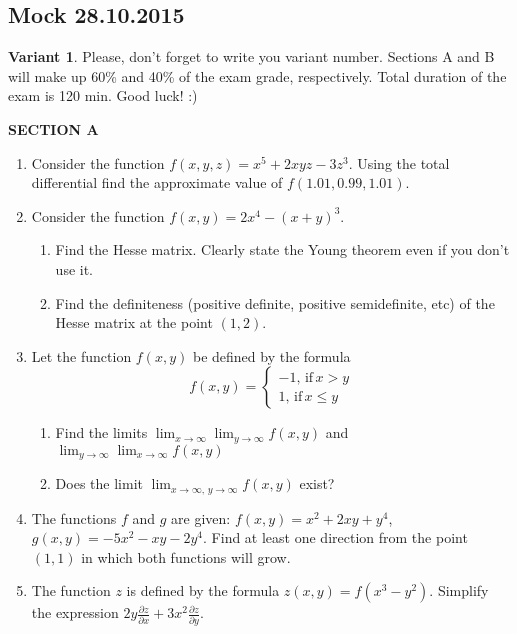 \subsection{Mock 28.10.2015}


\textbf{Variant 1}. Please, don't forget to write you variant number. Sections A and B will make up 60\% and 40\% of the exam grade, respectively. Total duration of the exam is 120 min. Good luck! :)



\textbf{SECTION A}

\begin{enumerate}

\item Consider the function $f(x,y,z)=x^5+2xyz-3z^3$. Using the total differential find the approximate value of $f(1.01,0.99,1.01)$.

\item Consider the function $f(x,y)=2x^4-(x+y)^3$.
\begin{enumerate}
\item Find the Hesse matrix. Clearly state the Young theorem even if you don't use it.
\item Find the definiteness (positive definite, positive semidefinite, etc) of the Hesse matrix at the point $(1,2)$.
\end{enumerate}

\item Let the function $f(x,y)$ be defined by the formula
\[
f(x,y)=\begin{cases}
-1, \, \text{if} \, x>y \\
1, \, \text{if} \, x\leq y
\end{cases}
\]

\begin{enumerate}
\item Find the limits $\lim_{x\to\infty}\lim_{y\to \infty} f(x,y)$ and $\lim_{y\to\infty}\lim_{x\to \infty} f(x,y)$
\item Does the limit $\lim_{x\to\infty, \, y\to \infty} f(x,y)$ exist?
\end{enumerate}


\item The functions $f$ and $g$ are given: $f(x,y)=x^2+2xy+y^4$, $g(x,y)=-5x^2-xy-2y^4$. Find at least one direction from the point $(1,1)$ in which both functions will grow.

\item The function $z$ is defined by the formula $z(x,y)=f(x^3-y^2)$. Simplify the expression $2y\frac{\partial z}{\partial x}+3x^2\frac{\partial z}{\partial y}$.


\end{enumerate}

